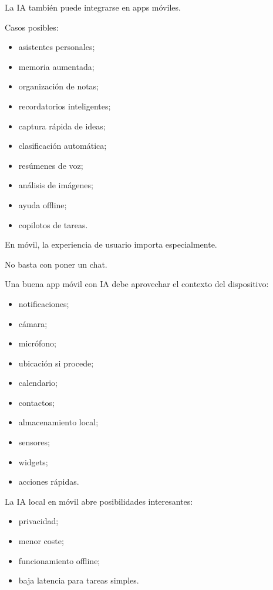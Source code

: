 La IA también puede integrarse en apps móviles.

Casos posibles:

\begin{itemize}
\tightlist
\item
  asistentes personales;
\item
  memoria aumentada;
\item
  organización de notas;
\item
  recordatorios inteligentes;
\item
  captura rápida de ideas;
\item
  clasificación automática;
\item
  resúmenes de voz;
\item
  análisis de imágenes;
\item
  ayuda offline;
\item
  copilotos de tareas.
\end{itemize}

En móvil, la experiencia de usuario importa especialmente.

No basta con poner un chat.

Una buena app móvil con IA debe aprovechar el contexto del dispositivo:

\begin{itemize}
\tightlist
\item
  notificaciones;
\item
  cámara;
\item
  micrófono;
\item
  ubicación si procede;
\item
  calendario;
\item
  contactos;
\item
  almacenamiento local;
\item
  sensores;
\item
  widgets;
\item
  acciones rápidas.
\end{itemize}

La IA local en móvil abre posibilidades interesantes:

\begin{itemize}
\tightlist
\item
  privacidad;
\item
  menor coste;
\item
  funcionamiento offline;
\item
  baja latencia para tareas simples.
\end{itemize}

